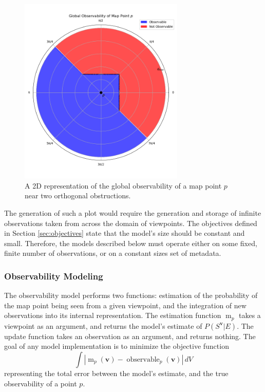 \begin{figure}[!ht]
    \centering
    \includegraphics[width=0.7\textwidth]{resources/global_observability_p.png}
    \caption[2D Global Observability]{A 2D representation of the global observability of a map point $p$ near two orthogonal obstructions.}
    \label{fig:global_observability_p}
\end{figure}

The generation of such a plot would require the generation and storage of infinite observations taken from across the domain of viewpoints. The objectives defined in Section \ref{sec:objectives} state that the model's size should be constant and small. Therefore, the models described below must operate either on some fixed, finite number of observations, or on a constant sizes set of metadata.

\subsubsection{Observability Modeling}

The observability model performs two functions: estimation of the probability of the map point being seen from a given viewpoint, and the integration of new observations into its internal representation. The estimation function $\operatorname{m}_p$ takes a viewpoint as an argument, and returns the model's estimate of $P(S^{\boldsymbol{v}}|E)$. The update function takes an observation as an argument, and returns nothing. The goal of any model implementation is to minimize the objective function
$$
    \int |\operatorname{m}_p(\boldsymbol{v}) - \operatorname{observable}_p(\boldsymbol{v})| \,dV
$$
representing the total error between the model's estimate, and the true observability of a point $p$.

